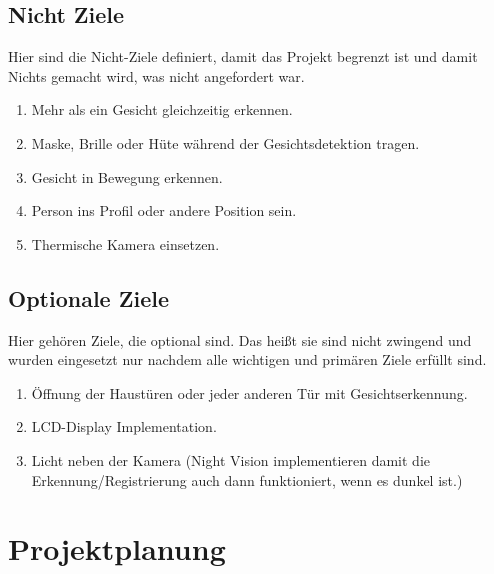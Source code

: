 \subsection{Nicht Ziele}
Hier sind die Nicht-Ziele definiert, damit das Projekt begrenzt ist und damit Nichts gemacht wird, was nicht angefordert war.

\begin{enumerate}
	\item Mehr als ein Gesicht gleichzeitig erkennen.
	
	\item Maske, Brille oder Hüte w\"ahrend der Gesichtsdetektion tragen.
	
	\item Gesicht in Bewegung erkennen.
	
	\item Person ins Profil oder andere Position sein.
	
	\item Thermische Kamera einsetzen.
	
	
\end{enumerate}
\subsection{Optionale Ziele}
Hier gehören Ziele, die optional sind. Das heißt sie sind nicht zwingend und wurden eingesetzt nur nachdem alle wichtigen und primären Ziele erfüllt sind.

\begin{enumerate}
	
	
	\item Öffnung der Haustüren oder jeder anderen Tür mit Gesichtserkennung.
	
	\item LCD-Display Implementation.
	
	\item Licht neben der Kamera (Night Vision implementieren damit die Erkennung/Registrierung auch dann funktioniert, wenn es dunkel ist.)
\end{enumerate}

\section{Projektplanung}

